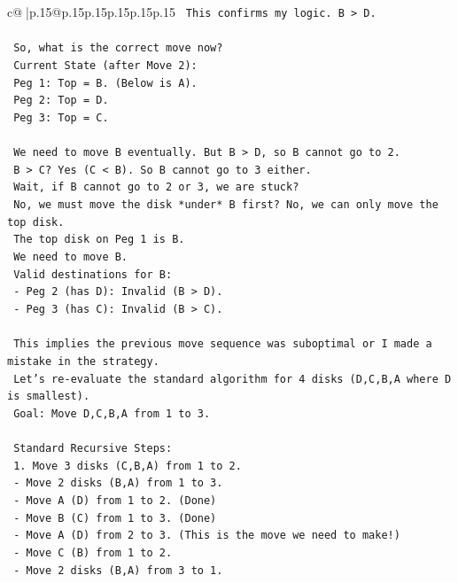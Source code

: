 \documentclass{article}
\begin{document}
{\begin{supertabular}{c@{$\;$}|p{.15\linewidth}@{}p{.15\linewidth}p{.15\linewidth}p{.15\linewidth}p{.15\linewidth}p{.15\linewidth}}
{{{\texttt{   This confirms my logic. B > D.} \\
\\ 
\texttt{   So, what is the correct move now?} \\
\texttt{   Current State (after Move 2):} \\
\texttt{   Peg 1: Top = B. (Below is A).} \\
\texttt{   Peg 2: Top = D.} \\
\texttt{   Peg 3: Top = C.} \\
\\ 
\texttt{   We need to move B eventually. But B > D, so B cannot go to 2.} \\
\texttt{   B > C? Yes (C < B). So B cannot go to 3 either.} \\
\texttt{   Wait, if B cannot go to 2 or 3, we are stuck?} \\
\texttt{   No, we must move the disk *under* B first? No, we can only move the top disk.} \\
\texttt{   The top disk on Peg 1 is B.} \\
\texttt{   We need to move B.} \\
\texttt{   Valid destinations for B:} \\
\texttt{   {-} Peg 2 (has D): Invalid (B > D).} \\
\texttt{   {-} Peg 3 (has C): Invalid (B > C).} \\
\\ 
\texttt{   This implies the previous move sequence was suboptimal or I made a mistake in the strategy.} \\
\texttt{   Let's re{-}evaluate the standard algorithm for 4 disks (D,C,B,A where D is smallest).} \\
\texttt{   Goal: Move D,C,B,A from 1 to 3.} \\
\\ 
\texttt{   Standard Recursive Steps:} \\
\texttt{   1. Move 3 disks (C,B,A) from 1 to 2.} \\
\texttt{      {-} Move 2 disks (B,A) from 1 to 3.} \\
\texttt{        {-} Move A (D) from 1 to 2. (Done)} \\
\texttt{        {-} Move B (C) from 1 to 3. (Done)} \\
\texttt{        {-} Move A (D) from 2 to 3. (This is the move we need to make!)} \\
\texttt{      {-} Move C (B) from 1 to 2.} \\
\texttt{      {-} Move 2 disks (B,A) from 3 to 1.} \\
}}}
\end{supertabular}}
\end{document}
